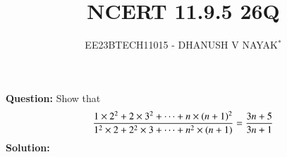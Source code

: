 \documentclass[journal,12pt,twocolumn]{IEEEtran}
\theoremstyle{remark}
\begin{document}

\vspace{3cm}

\title{NCERT 11.9.5 26Q}
\author{EE23BTECH11015 - DHANUSH V NAYAK$^{*}$%
}
\maketitle
\newpage
\bigskip

\renewcommand{\thefigure}{\theenumi}
\renewcommand{\thetable}{\theenumi}


\textbf{Question:} Show that
\begin{align}
    \frac{1\times2^2 + 2\times3^2 + \dots + n\times(n+1)^2}{1^2\times2 + 2^2\times3 + \dots + n^2\times(n+1)}  = \frac{3n+5}{3n+1}\notag
\end{align}
\textbf{Solution:}

\end{document}
